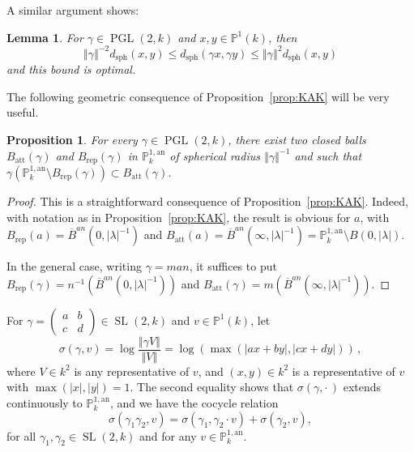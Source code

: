 \documentclass[10pt]{amsart}
\newtheorem{lemm}[theo]{Lemma}\newtheorem{prop}[theo]{Proposition}\newtheorem{coro}[theo]{Corollary}\newtheorem{conj}[theo]{Conjecture}
\theoremstyle{definition}\newtheorem{defi}[theo]{Definition}\newtheorem{rema}[theo]{Remark}\newtheorem{exam}[theo]{Example}\newtheorem{exem}[theo]{Example}\newtheorem{nota}[theo]{Notation}
\DeclareMathOperator{\sph}{sph}
\DeclareMathOperator{\SL}{SL}
\DeclareMathOperator{\PGL}{PGL}
\newcommand{\pp}{\mathbb{P}}
\newcommand{\an}{\mathrm{an}}
\newcommand{\norm}[1]{\left\Vert#1\right\Vert}
\newcommand{\abs}[1]{\left\vert#1\right\vert}
\newcommand{\PP}{\mathbb{P}}
\newcommand{\berk}{{\mathbb{P}^{1, \mathrm{an}}_k}}
\newcommand{\lrpar}[1]{\left(#1\right)}
\newcommand{\la}{\lambda}
\newcommand{\att}{\mathrm{att}}
\newcommand{\rep}{\mathrm{rep}}
\newcommand{\SLk}{\SL(2,k)}
\newcommand{\PGLk}{\PGL(2, k)}
\newcommand{\inv}{^{-1}}
\begin{document}
A similar argument shows:

\begin{lemm}\label{lem:lipschitz}
For $\gamma\in \PGLk$ and $x, y\in \PP^1(k)$, then
\[
\norm{\gamma}^{-2} d_{\sph}(x, y)\leq d_{\sph}(\gamma x, \gamma y)\leq
\norm{\gamma}^{2} d_\mathrm{sph}(x, y)
\]
and this bound is optimal.
\end{lemm}

The following geometric consequence of Proposition~\ref{prop:KAK} will be very useful.

\begin{prop}\label{prop:B att rep}
For every $\gamma\in \PGLk$, there exist two closed balls $B_\att(\gamma)$ and $B_\rep(\gamma)$ in $\PP^{1,\an}_k$ of spherical radius $\norm{\gamma}\inv$ and such that $\gamma(\PP^{1,\an}_k\setminus B_\rep(\gamma))\subset B_\att(\gamma)$.
\end{prop}

\begin{proof}
This is a straightforward consequence of Proposition~\ref{prop:KAK}. Indeed, with notation as in Proposition~\ref{prop:KAK}, the result is obvious for $a$, with $B_\rep(a) = \overline{B}^{an}(0, \abs{\la}\inv)$ and $B_\att(a) = \overline{B}^{an}(\infty, \abs{\la}\inv) = \pp^{1,\an}_k\setminus B(0, \abs{\la})$.

In the general case, writing $\gamma =man$, it suffices to put $B_{\rep}(\gamma) = n\inv (\overline{B}^{an}(0, \abs{\lambda}\inv))$ and $B_{\att}(\gamma) = m (\overline{B}^{an}(\infty, \abs{\lambda}\inv))$.
\end{proof}

For $\gamma = \lrpar{
\begin{smallmatrix} a & b \\ c & d
\end{smallmatrix}} \in \SLk$ and $v\in \pp^1(k)$, let
\begin{equation}\label{eq:sigma1}
\sigma(\gamma,v) = \log\frac{\norm{\gamma V}}{\norm{V}} =\log \lrpar{\max (\abs{ax+by}, \abs{cx+dy}) }\,,
\end{equation}
where $V\in k^2$ is any representative of $v$, and $(x,y)\in k^2$ is a representative of $v$ with $\max (\abs{x}, \abs{y})=1$. The second equality shows that $\sigma(\gamma,{\cdot\,})$ extends continuously to $\berk$, and we have the cocycle relation
\begin{equation}\label{eq:cocycle}
\sigma(\gamma_1 \gamma_2,v) = \sigma(\gamma_1, \gamma_2 \cdot v) + \sigma(\gamma_2, v),
\end{equation}
for all $\gamma_1, \gamma_2 \in \SL(2,k)$ and for any $v\in \PP^{1,\an}_k$.
\end{document}
